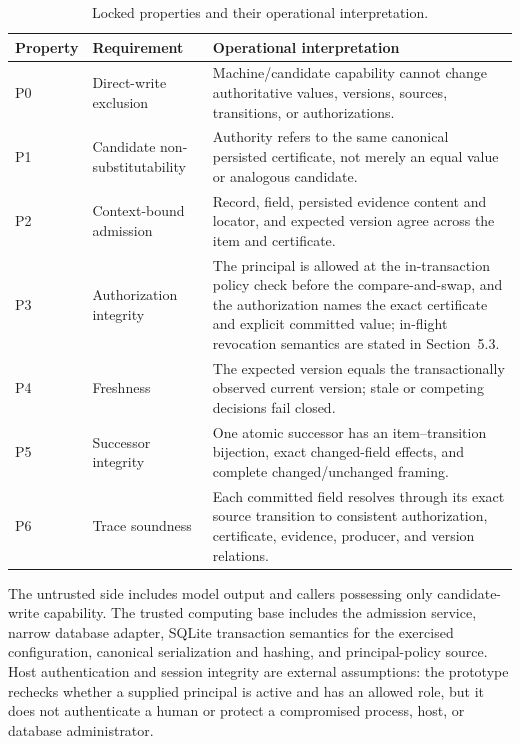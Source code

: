 \begin{table}[t]
\centering
\caption{Locked properties and their operational interpretation.}
\label{tab:properties}
\begin{tabularx}{\textwidth}{@{}l>{\raggedright\arraybackslash}p{}>{\raggedright\arraybackslash}X@{}}
\toprule
Property & Requirement & Operational interpretation \\
\midrule
P0 & Direct-write exclusion & Machine/candidate capability cannot change authoritative values, versions, sources, transitions, or authorizations. \\
P1 & Candidate non-substitutability & Authority refers to the same canonical persisted certificate, not merely an equal value or analogous candidate. \\
P2 & Context-bound admission & Record, field, persisted evidence content and locator, and expected version agree across the item and certificate. \\
P3 & Authorization integrity & The principal is allowed at the in-transaction policy check before the compare-and-swap, and the authorization names the exact certificate and explicit committed value; in-flight revocation semantics are stated in Section~5.3. \\
P4 & Freshness & The expected version equals the transactionally observed current version; stale or competing decisions fail closed. \\
P5 & Successor integrity & One atomic successor has an item--transition bijection, exact changed-field effects, and complete changed/unchanged framing. \\
P6 & Trace soundness & Each committed field resolves through its exact source transition to consistent authorization, certificate, evidence, producer, and version relations. \\
\bottomrule
\end{tabularx}
\end{table}

The untrusted side includes model output and callers possessing only candidate-write capability. The trusted computing base includes the admission service, narrow database adapter, SQLite transaction semantics for the exercised configuration, canonical serialization and hashing, and principal-policy source. Host authentication and session integrity are external assumptions: the prototype rechecks whether a supplied principal is active and has an allowed role, but it does not authenticate a human or protect a compromised process, host, or database administrator.

